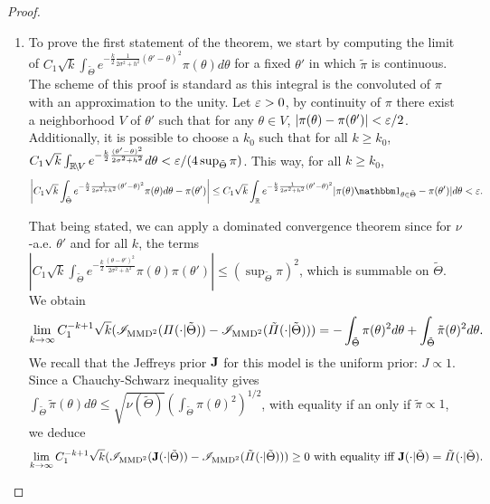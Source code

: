 \begin{proof}
\begin{enumerate}
    \item To prove the first statement of the theorem, 
    we start by  computing the limit of $C_1\sqrt{k}\int_{\tilde\Theta}e^{-\frac{k}{2}\frac{1}{2\sigma^2+h^2}(\theta'-\theta)^2}\pi(\theta)d\theta $ for a fixed $\theta'$ in which $\tilde\pi$ is continuous. The scheme of this proof is standard as this integral is the convoluted of  $\pi$ with an approximation to the unity. Let $\varepsilon>0$, by continuity of $\pi$ there exist a neighborhood $V$ of $\theta'$ such that for any $\theta\in V$,  $|\pi(\theta)-\pi(\theta')|<\varepsilon/2$. %
    Additionally, it is possible to choose a $k_0$ such that for all $k\geq k_0$, $C_1\sqrt{k}\int_{\mathbb{R}\!\setminus\!V} e^{-\frac{k}{2}\frac{(\theta'-\theta)^2}{2\sigma^2+h^2}}d\theta <\varepsilon/(4\sup_{\tilde\Theta}\pi)$. This way, for all $k\geq k_0$,
        \begin{equation}
            \left|C_1\sqrt{k}\int_{\tilde\Theta}e^{-\frac{k}{2}\frac{1}{2\sigma^2+h^2}(\theta'-\theta)^2}\pi(\theta)d\theta -\pi(\theta')  \right| \leq C_1\sqrt{k}\int_{\RR}e^{-\frac{k}{2}\frac{1}{2\sigma^2+h^2}(\theta'-\theta)^2} |\pi(\theta)\indic_{\theta\in\tilde\Theta}-\pi(\theta')|d\theta 
            <\eps.
        \end{equation}
    
    That being stated, we can apply a dominated convergence theorem since for $\nu$-a.e. $\theta'$ and for all $k$, the terms $|C_1\sqrt{k}\int_{\tilde\Theta} e^{-\frac{k}{2}\frac{(\theta-\theta')^2}{2\sigma^2+h^2}}\pi(\theta)\pi(\theta') |\leq(\sup_{\tilde\Theta}\pi)^2$, which is summable on $\tilde\Theta$.
    We obtain
    \begin{equation}
        \lim_{k\rightarrow\infty} C_1^{-k+1}\sqrt{k}(\mathscr{I}_{\text{MMD}^2}(\varPi(\cdot|\tilde\Theta))-\mathscr{I}_{\text{MMD}^2}(\tilde\varPi(\cdot|\tilde\Theta)) ) = -\int_{\tilde\Theta}\pi(\theta)^2d\theta + \int_{\tilde\Theta}\tilde\pi(\theta)^2d\theta.
    \end{equation}
    We recall that the Jeffreys prior $\mathbf{J} $ for this model is the uniform prior: $J\propto 1$.
    Since a Chauchy-Schwarz inequality gives $\int_{\tilde\Theta}\tilde\pi(\theta)d\theta \leq \sqrt{\nu(\tilde\Theta)} \left(\int_{\tilde\Theta}\pi(\theta)^2 \right)^{1/2}$, with equality if an only if $\tilde\pi\propto 1$, we deduce 
    \begin{equation}
        \lim_{k\rightarrow\infty} C_1^{-k+1}\sqrt{k}(\mathscr{I}_{\text{MMD}^2}(\mathbf{J}(\cdot|\tilde\Theta))-\mathscr{I}_{\text{MMD}^2}(\tilde\varPi(\cdot|\tilde\Theta)) ) \geq 0 \text{\ with equality iff\ }\mathbf{J}(\cdot|\tilde\Theta) = \tilde\varPi(\cdot|\tilde\Theta).
    \end{equation}


\end{enumerate}
\end{proof}
